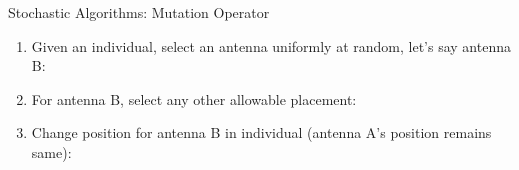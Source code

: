 \documentclass{beamer}
\begin{document}
\begin{frame}[t]{Stochastic Algorithms: Mutation Operator}
    \begin{enumerate}
        \item Given an individual, select an antenna uniformly at random, let's say antenna B:\par
            \begin{minipage}[t]{\linewidth}
                \centering
            \end{minipage}
        \item For antenna B, select any other allowable placement:\par
            \begin{minipage}[t]{\linewidth}
                \centering
            \end{minipage}
        \item Change position for antenna B in individual (antenna A's position remains same):\par
            \begin{minipage}[t]{\linewidth}
                \centering
            \end{minipage}
    \end{enumerate}
\end{frame}
\end{document}

